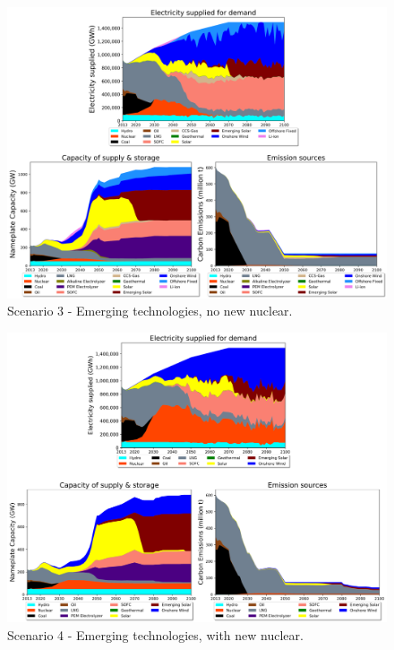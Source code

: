 \begin{figure}[H] 
\centering
\includegraphics[scale=0.5]{figures/newtechs_nonuc}
\caption{Scenario 3 - Emerging technologies, no new nuclear.}
\label{scen3}
\end{figure}

\begin{figure}[H] 
\centering
\includegraphics[scale=0.5]{figures/newtechs_nuc}
\caption{Scenario 4 - Emerging technologies, with new nuclear.}
\label{scen4}
\end{figure}

